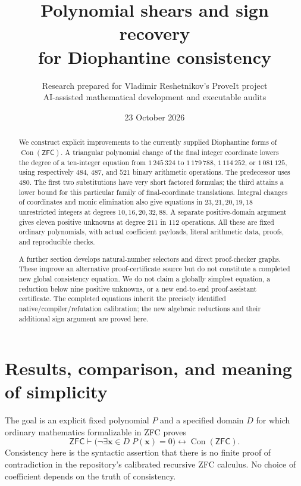 \documentclass[11pt]{article}
\title{Polynomial shears and sign recovery\\for Diophantine consistency}
\author{Research prepared for Vladimir Reshetnikov's ProveIt project\\\small AI-assisted mathematical development and executable audits}
\date{23 October 2026}
\theoremstyle{definition}
\theoremstyle{remark}
\newcommand{\Con}{\operatorname{Con}}
\newcommand{\ZFC}{\mathsf{ZFC}}
\begin{document}
\maketitle
\begin{abstract}
We construct explicit improvements to the currently supplied Diophantine
forms of $\Con(\ZFC)$. A triangular polynomial change of the final integer
coordinate lowers the degree of a ten-integer equation from $1\,245\,324$
to $1\,179\,788$, $1\,114\,252$, or $1\,081\,125$, using respectively
$484$, $487$, and $521$ binary arithmetic operations. The predecessor uses
$480$. The first two substitutions have very short factored formulas; the
third attains a lower bound for this particular family of final-coordinate
translations. Integral changes of coordinates and monic elimination also
give equations in $23,21,20,19,18$ unrestricted integers at degrees
$10,16,20,32,88$. A separate positive-domain argument gives eleven positive
unknowns at degree $211$ in $112$ operations. All these are fixed ordinary
polynomials, with actual coefficient payloads, literal arithmetic data,
proofs, and reproducible checks.

A further section develops natural-number selectors and direct proof-checker
graphs. These improve an alternative proof-certificate source but do not
constitute a completed new global consistency equation. We do not claim a
globally simplest equation, a reduction below nine positive unknowns, or a
new end-to-end proof-assistant certificate. The completed equations inherit
the precisely identified native/compiler/refutation calibration; the new
algebraic reductions and their additional sign argument are proved here.
\end{abstract}
\tableofcontents

\section{Results, comparison, and meaning of simplicity}

The goal is an explicit fixed polynomial $P$ and a specified domain $D$ for
which ordinary mathematics formalizable in ZFC proves
\begin{equation}\label{eq:goal}
 \ZFC\vdash
 \bigl(\neg\exists\boldsymbol x\in D\;P(\boldsymbol x)=0\bigr)
 \longleftrightarrow \Con(\ZFC).
\end{equation}
Consistency here is the syntactic assertion that there is no finite proof
of contradiction in the repository's calibrated recursive ZFC calculus.
No choice of coefficient depends on the truth of consistency.
\end{document}
